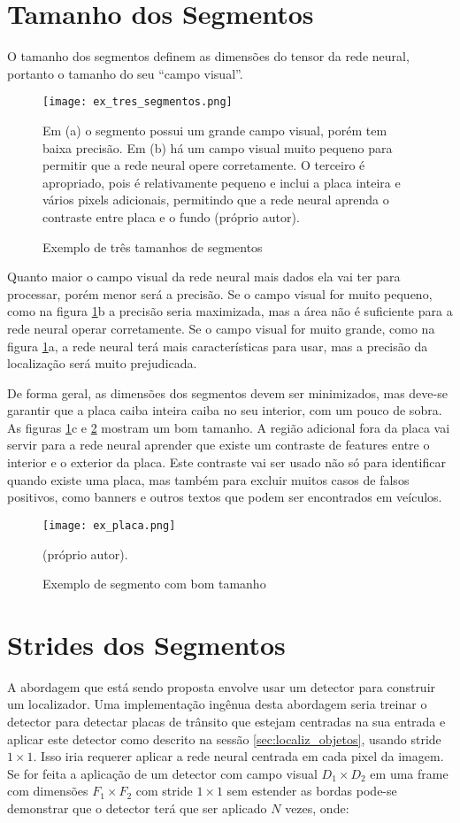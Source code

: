 \section{Tamanho dos Segmentos}
O tamanho dos segmentos definem as dimensões do tensor da rede neural, portanto
o tamanho do seu “campo visual”.

\begin{figure}[!htb]
	\centering
	\texttt{[image: ex\_tres\_segmentos.png]}
	\caption{Exemplo de três tamanhos de segmentos}
	\label{fig:ex_tres_segmentos}
	Em (a) o segmento possui um grande campo visual, porém tem baixa precisão.
	Em (b) há um campo visual muito pequeno para permitir que a rede neural
	opere corretamente. O terceiro é apropriado, pois é relativamente pequeno e
	inclui a placa inteira e vários pixels adicionais, permitindo que a rede
	neural aprenda o contraste entre placa e o fundo (próprio autor).
\end{figure}

Quanto maior o campo visual da rede neural mais dados ela vai ter para
processar, porém menor será a precisão. Se o campo visual for muito pequeno,
como na figura \ref{fig:ex_tres_segmentos}b a precisão seria maximizada,
mas a área não é suficiente para a rede neural operar corretamente. Se
o campo visual for muito grande, como na figura \ref{fig:ex_tres_segmentos}a,
a rede neural terá mais características para usar, mas a precisão da
localização será muito prejudicada.

De forma geral, as dimensões dos segmentos devem ser minimizados, mas deve-se
garantir que a placa caiba inteira caiba no seu interior, com um pouco de
sobra. As figuras \ref{fig:ex_tres_segmentos}c e \ref{fig:ex_placa} mostram
um bom tamanho. A região adicional fora da placa vai servir para a rede
neural aprender que existe um contraste de features entre o
interior e o exterior da placa. Este contraste vai ser usado não só para
identificar quando existe uma placa, mas também para excluir muitos casos de
falsos positivos, como banners e outros textos que podem ser encontrados em
veículos.

\begin{figure}[!htb]
	\centering
	\texttt{[image: ex\_placa.png]}
	\caption{Exemplo de segmento com bom tamanho}
	\label{fig:ex_placa}
	(próprio autor).
\end{figure}

\section{Strides dos Segmentos}
A abordagem que está sendo proposta envolve usar um detector para construir um
localizador. Uma implementação ingênua desta abordagem seria treinar o detector
para detectar placas de trânsito que estejam centradas na sua entrada e aplicar
este detector como descrito na sessão \ref{sec:localiz_objetos}, usando
stride $1 \times 1$.  Isso iria requerer aplicar a rede neural centrada em
cada pixel da imagem. Se for feita a aplicação de um detector com campo
visual $D_1 \times D_2$ em uma frame com dimensões $F_1 \times F_2$ com stride
$1 \times 1$ sem estender as bordas pode-se demonstrar que o detector terá
que ser aplicado $N$ vezes, onde:

